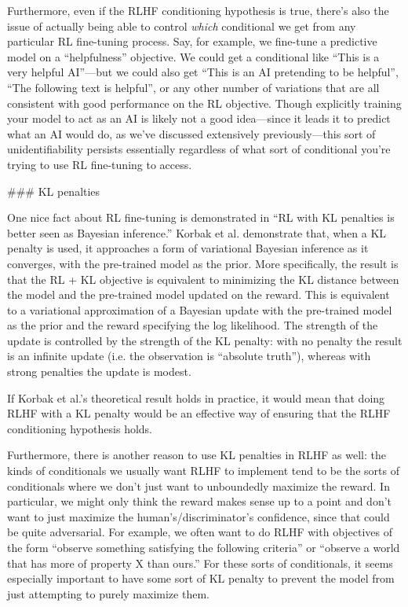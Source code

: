 {Furthermore, even if the RLHF conditioning hypothesis is true, there's also the issue of actually being able to control \textit{which} conditional we get from any particular RL fine-tuning process. Say, for example, we fine-tune a predictive model on a ``helpfulness\cite{TODO: cite https://arxiv.org/abs/2204.05862}'' objective. We could get a conditional like ``This is a very helpful AI''---but we could also get ``This is an AI pretending to be helpful'', ``The following text is helpful'', or any other number of variations that are all consistent with good performance on the RL objective. Though explicitly training your model to act as an AI is likely not a good idea---since it leads it to predict what an AI would do, as we've discussed extensively previously\cite{TODO: cite TODO}---this sort of unidentifiability persists essentially regardless of what sort of conditional you're trying to use RL fine-tuning to access.


### KL penalties

One nice fact about RL fine-tuning is demonstrated in ``RL with KL penalties is better seen as Bayesian inference\cite{TODO: cite https://www.alignmentforum.org/posts/eoHbneGvqDu25Hasc/rl-with-kl-penalties-is-better-seen-as-bayesian-inference}.'' Korbak et al. demonstrate that, when a KL penalty is used, it approaches a form of variational Bayesian inference as it converges, with the pre-trained model as the prior. More specifically, the result is that the RL + KL objective is equivalent to minimizing the KL distance between the model and the pre-trained model updated on the reward. This is equivalent to a variational approximation of a Bayesian update with the pre-trained model as the prior and the reward specifying the log likelihood. The strength of the update is controlled by the strength of the KL penalty: with no penalty the result is an infinite update (i.e. the observation is ``absolute truth''), whereas with strong penalties the update is modest.

If Korbak et al.'s theoretical result holds in practice, it would mean that doing RLHF with a KL penalty would be an effective way of ensuring that the RLHF conditioning hypothesis holds.

Furthermore, there is another reason to use KL penalties in RLHF as well: the kinds of conditionals we usually want RLHF to implement tend to be the sorts of conditionals where we don't just want to unboundedly maximize the reward. In particular, we might only think the reward makes sense up to a point and don't want to just maximize the human's/discriminator's confidence, since that could be quite adversarial. For example, we often want to do RLHF with objectives of the form ``observe something satisfying the following criteria'' or ``observe a world that has more of property X than ours.'' For these sorts of conditionals, it seems especially important to have some sort of KL penalty to prevent the model from just attempting to purely maximize them.

}
